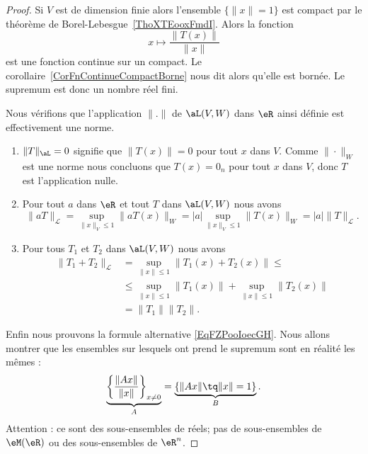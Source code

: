 \begin{proof}
    Si \( V\) est de dimension finie alors l'ensemble $\{ \| x \|= 1 \}$ est compact par le théorème de Borel-Lebesgue~\ref{ThoXTEooxFmdI}. Alors la fonction
    \begin{equation}
        x\mapsto \frac{ \| T(x) \| }{ \| x \| }
    \end{equation}
    est une fonction continue sur un compact. Le corollaire~\ref{CorFnContinueCompactBorne} nous dit alors qu'elle est bornée. Le supremum est donc un nombre réel fini.

    Nous vérifions que l'application $\| . \|$ de $\aL(V,W)$ dans $\eR$ ainsi définie est effectivement une norme.
    \begin{enumerate}
        \item
            $\|T\|_{\aL}=0$ signifie que $\|T(x)\|=0$ pour tout $x$ dans $V$. Comme  $\|\cdot\|_W$ est une norme nous concluons que $T(x)=0_{n}$ pour tout $x$ dans $V$, donc $T$ est l'application nulle.
    \item
        Pour tout $a$ dans $\eR$ et tout  $T$ dans $\aL(V,W)$ nous avons
        \begin{equation}
            \|aT\|_{\mathcal{L}}=\sup_{\|x\|_{V}\leq 1}\|aT(x)\|_{W}=|a|\sup_{\|x\|_{V}\leq 1}\|T(x)\|_{W}=|a|\|T\|_{\mathcal{L}}.
        \end{equation}
    \item
        Pour tous $T_1$ et $T_2$ dans $\aL(V,W)$ nous avons
      \begin{equation}\nonumber
        \begin{aligned}
           \|T_1+ T_2\|_{\mathcal{L}}&=\sup_{\|x\|\leq 1}\|T_1(x)+T_2(x)\|\leq\\
     &\leq\sup_{\|x\|\leq 1}\|T_1(x)\| +\sup_{\|x\|\leq 1}\|T_2(x)\|\\
     &=\|T_1\|\|T_2\|.
        \end{aligned}
      \end{equation}
    \end{enumerate}


    Enfin nous prouvons la formule alternative \eqref{EqFZPooIoecGH}. Nous allons montrer que les ensembles sur lesquels ont prend le supremum sont en réalité les mêmes :
    \begin{equation}
        \underbrace{\left\{ \frac{ \| Ax \| }{ \| x \| }\right\}_{x\neq 0}}_{A}=\underbrace{\left\{ \| Ax \|\tq \| x \|=1 \right\}}_{B}.
    \end{equation}
    Attention : ce sont des sous-ensembles de réels; pas de sous-ensembles de \( \eM(\eR)\) ou des sous-ensembles de \( \eR^n\).


\end{proof}
